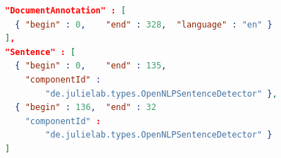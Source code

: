 \documentclass{article}
\begin{document}

\begin{lstlisting}[float,language=json,
                   caption=Excerpt of JSON output for sentence detection.,
                   label=lst:json_sententence_detection]
"DocumentAnnotation" : [
  { "begin" : 0,    "end" : 328,  "language" : "en" }
],
"Sentence" : [
  { "begin" : 0,    "end" : 135,
    "componentId" :
        "de.julielab.types.OpenNLPSentenceDetector" },
  { "begin" : 136,  "end" : 32
    "componentId" :
        "de.julielab.types.OpenNLPSentenceDetector" }
]
\end{lstlisting}
\end{document}
